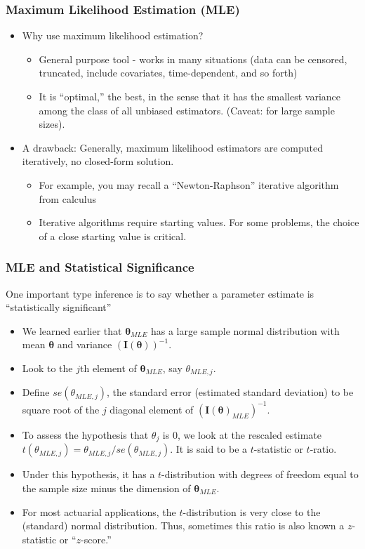 \documentclass{beamer}
\begin{document}
\begin{frame}[shrink=2]
\frametitle{Maximum Likelihood Estimation (MLE)}
\begin{itemize}
\item Why use maximum likelihood estimation?
\begin{itemize}
\item General purpose tool - works in many situations (data can be censored, truncated, include covariates, time-dependent, and so forth)
\item It is ``optimal,'' the best, in the sense that it has the smallest variance among the class of all unbiased estimators. (Caveat: for large sample sizes).
\end{itemize}
\item A drawback: Generally, maximum likelihood estimators are computed iteratively, no closed-form solution.
\begin{itemize}
\item For example, you may recall a ``Newton-Raphson'' iterative algorithm from calculus
\item Iterative algorithms require starting values. For some problems, the choice of a close starting value is critical.
\end{itemize}
\end{itemize}
\end{frame}

\begin{frame}[shrink=2]
\frametitle{MLE and Statistical Significance}
One important type inference is to say whether a parameter estimate is ``statistically significant''
\begin{itemize}
\item We learned earlier that $\boldsymbol \theta_{MLE}$ has a large sample normal distribution with mean $\boldsymbol \theta$ and variance $\left( \mathbf{I}(\boldsymbol \theta) \right)^{-1}$.
\item Look to the $j$th element of $\boldsymbol \theta_{MLE}$, say $\theta_{MLE,j}$.
\item Define $se(\theta_{MLE,j})$, the standard error (estimated standard deviation) to be square root of the $j$ diagonal element of $\left( \mathbf{I}(\boldsymbol \theta)_{MLE} \right)^{-1}$.
\item To assess the hypothesis that $\theta_j$ is 0, we look at the rescaled estimate $t(\theta_{MLE,j})=\theta_{MLE,j}/se(\theta_{MLE,j})$. It is said to be a $t$-statistic or $t$-ratio.
\item Under this hypothesis, it has a $t$-distribution with degrees of freedom equal to the sample size minus the dimension of $\boldsymbol \theta_{MLE}$.
\item For most actuarial applications, the $t$-distribution is very close to the (standard) normal distribution. Thus, sometimes this ratio is also known a $z$-statistic or ``$z$-score.''
\end{itemize}
\end{frame}
\end{document}
